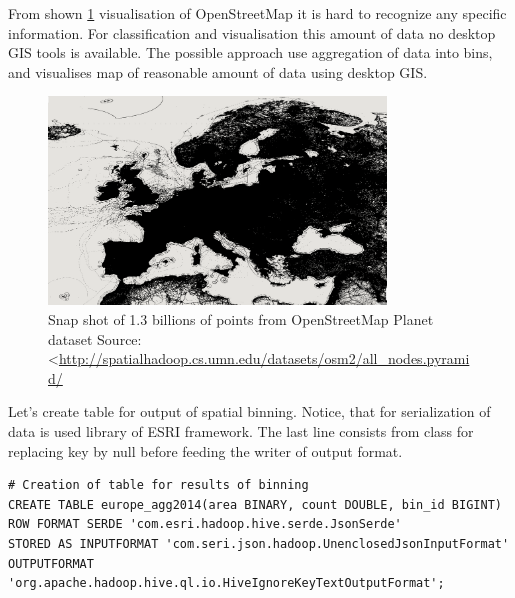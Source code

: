 \documentclass[a4paper,12pt,oneside]{report}
\begin{document}
	From shown \ref{map_eu} visualisation of OpenStreetMap it is hard to recognize any specific
		information. For classification  and visualisation this amount of data no
		desktop GIS tools is available. The possible approach use aggregation of data into bins, and
		visualises map of reasonable amount of data using desktop GIS.
		\begin{figure}[!htbp]
			\centering
			\includegraphics[width=0.8\textwidth]{./img/eu_all.png}
			\caption[OpenStreetMap Europe]{\centering Snap shot of 1.3 billions of points from
			OpenStreetMap Planet dataset \newline
			Source: \textless\url{http://spatialhadoop.cs.umn.edu/datasets/osm2/all_nodes.pyramid/}}
			\label{map_eu}
		\end{figure}
	
Let's create table for output of spatial binning. Notice, that for serialization of data is used library of ESRI framework. 
	The last line consists from class for replacing key by null before feeding the writer of output format.
\begin{footnotesize}
	\begin{lstlisting}[style=python]
# Creation of table for results of binning
CREATE TABLE europe_agg2014(area BINARY, count DOUBLE, bin_id BIGINT)
ROW FORMAT SERDE 'com.esri.hadoop.hive.serde.JsonSerde'              
STORED AS INPUTFORMAT 'com.seri.json.hadoop.UnenclosedJsonInputFormat'
OUTPUTFORMAT 'org.apache.hadoop.hive.ql.io.HiveIgnoreKeyTextOutputFormat';
		\end{lstlisting}
	\end{footnotesize}
	
\end{document}
